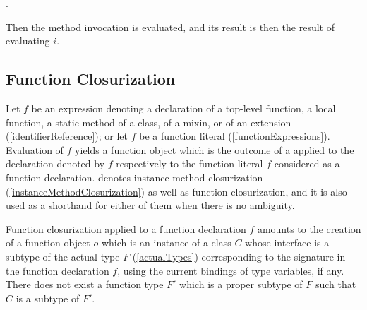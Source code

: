 \documentclass[makeidx]{article}
\begin{document}
{\begin{itemize}
  .
\end{itemize}

\LMHash{}%
Then the method invocation  is evaluated,
and its result is then the result of evaluating $i$.



\subsection{Function Closurization}

\LMHash{}%
Let $f$ be an expression denoting
a declaration of a top-level function, a local function,
a static method of a class, of a mixin, or of an extension
(\ref{identifierReference});
or let $f$ be a function literal
(\ref{functionExpressions}).
Evaluation of $f$ yields a function object
which is the outcome of a 
applied to the declaration denoted by $f$
respectively to the function literal $f$ considered as a function declaration.
denotes instance method closurization
(\ref{instanceMethodClosurization})
as well as function closurization,
and it is also used as a shorthand for either of them
when there is no ambiguity.

\LMHash{}%
Function closurization applied to a function declaration $f$
amounts to the creation of a function object $o$
which is an instance of a class $C$ whose interface is
a subtype of the actual type $F$
(\ref{actualTypes})
corresponding to the signature in the function declaration $f$,
using the current bindings of type variables, if any.
There does not exist a function type $F'$ which is a proper subtype of $F$
such that $C$ is a subtype of $F'$.


}
\end{document}
